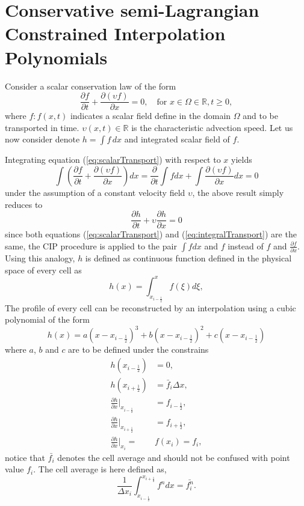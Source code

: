 \documentclass[10pt,a4paper]{article}
\newcommand{\pd}[2]{\frac{\partial #1}{\partial #2}}
\begin{document}
\section{Conservative semi-Lagrangian Constrained Interpolation Polynomials}
\label{sec:CIP-CSL}

Consider a scalar conservation law of the form
%
\begin{equation}
	\pd{f}{t} + \pd{(\upsilon f)}{x} = 0, 
	\quad\text{for } x\in\Omega\in\mathbb{R},t\geqslant0, 
	\label{eq:scalarTransport2}
\end{equation}
%
where $f:f(x,t)$ indicates a scalar field define in the domain $\Omega$ and to be transported in time. $\upsilon(x,t)\in\mathbb{R}$ is the characteristic advection speed. Let us now consider denote $h=\int f\,dx$ and integrated scalar field of $f$.

Integrating equation (\ref{eq:scalarTransport}) with respect to $x$ yields
%
\begin{equation}
	\int \left(\pd{f}{t} + \pd{(\upsilon f)}{x}\right) dx = 
	\pd{}{t} \int f dx + 
	\int  \pd{(\upsilon f)}{x} dx = 0
\end{equation}
%
under the assumption of a constant velocity field $\upsilon$, the above result simply reduces to 
% 
\begin{equation}
	\pd{h}{t} + \upsilon \pd{h}{x} = 0
	\label{eq:integralTransport}
\end{equation}
%
since both equations (\ref{eq:scalarTransport}) and (\ref{eq:integralTransport}) are the same, the CIP procedure is applied to the pair $\int f dx$ and $f$ instead of $f$ and $\pd{f}{x}$. Using this analogy,  $h$ is defined as continuous function defined in the physical space of every cell as 
%
\begin{equation}
	h(x) = \int_{x_{i-\frac{1}{2}}}^{x} f(\xi) d\xi,
\end{equation}
%
The profile of every cell can be reconstructed by an interpolation using a cubic polynomial of the form
%
\begin{equation}
	h(x) = a \left(x-x_{i-\frac{1}{2}} \right)^3 + 
		   b \left(x-x_{i-\frac{1}{2}} \right)^2 + 
		   c \left(x-x_{i-\frac{1}{2}} \right) 
\end{equation}
%
where $a$, $b$ and $c$ are to be defined under the constrains 
%
\begin{align}
	h(x_{i-\frac{1}{2}}) &= 0, \\
	h(x_{i+\frac{1}{2}}) &= \bar{f}_i \Delta x, \\
	\pd{h}{x}|_{x_{i-\frac{1}{2}}} &= f_{i-\frac{1}{2}}, \\
	\pd{h}{x}|_{x_{i+\frac{1}{2}}} &= f_{i+\frac{1}{2}}, \\
	\pd{h}{x}|_{x_i} = &f(x_i) = f_i, 
\end{align}
%
notice that $\bar{f_i}$ denotes the cell average and should not be confused with point value $f_i$. The cell average is here defined as,
%
\begin{equation}
	\frac{1}{\Delta x_i} \int_{x_{i-\frac{1}{2}}}^{x_{i+\frac{1}{2}}} f^{n} dx = \bar{f_i^n}.
\end{equation}
\end{document}
